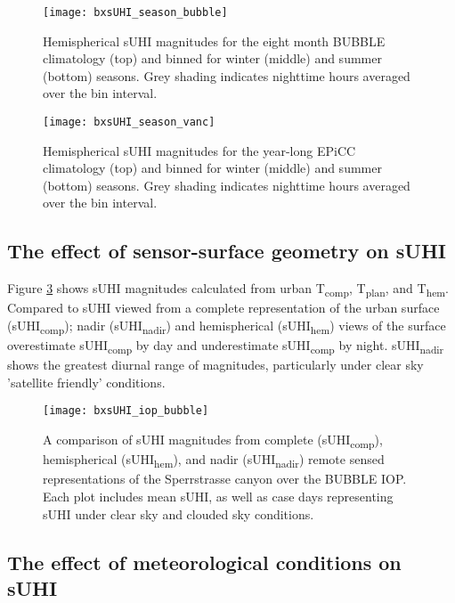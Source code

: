 \begin{bibunit}
\begin{figure}[H]
	\centering
	\texttt{[image: bxsUHI\_season\_bubble]}
	\caption{Hemispherical sUHI magnitudes for the eight month BUBBLE climatology (top) and binned for winter (middle) and summer (bottom) seasons. Grey shading indicates nighttime hours averaged over the bin interval.}
	\label{bxsUHI_season_bubble}
\end{figure}

\begin{figure}[H]
	\centering
	\texttt{[image: bxsUHI\_season\_vanc]}
	\caption{Hemispherical sUHI magnitudes for the year-long EPiCC climatology (top) and binned for winter (middle) and summer (bottom) seasons. Grey shading indicates nighttime hours averaged over the bin interval.}
	\label{bxsUHI_season_vanc}
\end{figure}

\subsection{The effect of sensor-surface geometry on sUHI}

Figure \ref{bx_suhi_compare} shows sUHI magnitudes calculated from urban T\textsubscript{comp}, T\textsubscript{plan}, and T\textsubscript{hem}. Compared to sUHI viewed from a complete representation of the urban surface (sUHI\textsubscript{comp}); nadir (sUHI\textsubscript{nadir}) and hemispherical (sUHI\textsubscript{hem}) views of the surface overestimate sUHI\textsubscript{comp} by day and underestimate sUHI\textsubscript{comp} by night. sUHI\textsubscript{nadir} shows the greatest diurnal range of magnitudes, particularly under clear sky 'satellite friendly' conditions. 

\begin{figure}[H]
	\centering
	\texttt{[image: bxsUHI\_iop\_bubble]}
	\caption{A comparison of sUHI magnitudes from complete (sUHI\textsubscript{comp}), hemispherical (sUHI\textsubscript{hem}), and nadir (sUHI\textsubscript{nadir}) remote sensed representations of the Sperrstrasse canyon over the BUBBLE IOP. Each plot includes mean sUHI, as well as case days representing sUHI under clear sky and clouded sky conditions.}
	\label{bx_suhi_compare}
\end{figure}

\subsection{The effect of meteorological conditions on sUHI}


\end{bibunit}
